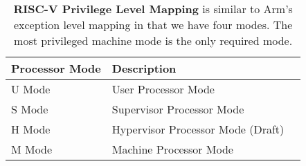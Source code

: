 \begin{table}[t]
\centering
\begin{tabular}{|l|l|l|}
\hline
\textbf{Processor Mode} & \textbf{Description} \\ \hline
U Mode & User Processor Mode \\ \hline
S Mode & Supervisor Processor Mode \\ \hline
H Mode & Hypervisor Processor Mode (Draft) \\ \hline
M Mode & Machine Processor Mode \\ \hline
\end{tabular}
\caption[RISC-V Processor Modes]{\textbf{RISC-V Privilege Level Mapping} is similar to Arm's exception level mapping in that we have four modes. The most privileged machine mode is the only required mode.}
\label{table:rv-priv}
\end{table}
